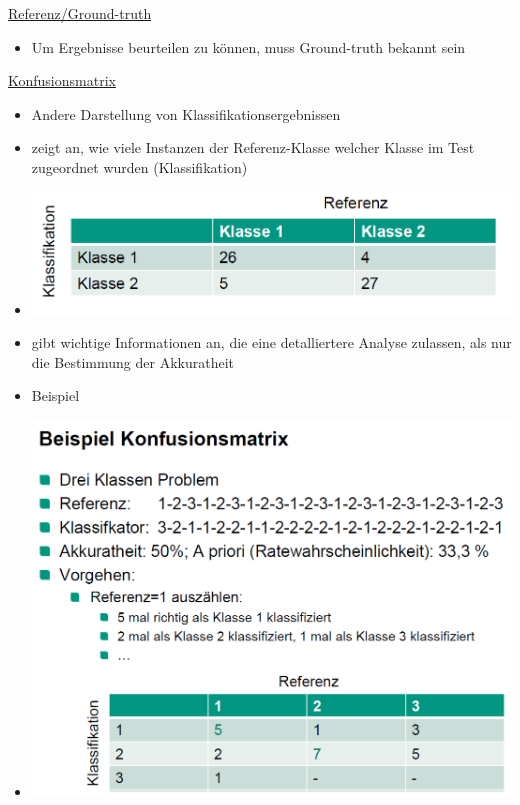 \documentclass[a4paper,10pt,oneside]{article}
\begin{document}
\underline{Referenz/Ground-truth} \\
 		\begin{itemize}
 			\item Um Ergebnisse beurteilen zu können, muss Ground-truth bekannt sein
 		\end{itemize}
 		
\underline{Konfusionsmatrix} \\
	\begin{itemize}
		\item Andere Darstellung von Klassifikationsergebnissen
		\item zeigt an, wie viele Instanzen der Referenz-Klasse welcher Klasse im Test zugeordnet wurden (Klassifikation)
		\item[] \includegraphics[scale=0.2]{Grafiken/2406.png}
		\item gibt wichtige Informationen an, die eine detalliertere Analyse zulassen, als nur die Bestimmung der Akkuratheit
		\item Beispiel 
		\item[] \includegraphics[scale=0.2]{Grafiken/2408.png}
	\end{itemize}
	
\end{document}
